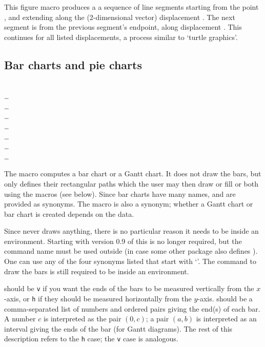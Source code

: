 \documentclass[letterpaper]{article}
\begin{document}
This figure macro produces a a sequence of line segments starting from
the point , and extending along the (2-dimen\-sional vector)
displacement . The next segment is from the previous
segment's endpoint, along displacement . This continues for
all listed displacements, a process similar to `turtle graphics'.


\subsection{Bar charts and pie charts}\label{charts}

\begin{cd}
%
  \\
\dots\\
\dots\\
\dots\\
\dots\\
\dots\\
\dots\\
\dots
{}%
%
%
%
\end{cd}

The macro  computes a bar chart or a Gantt chart. It does
not draw the bars, but only defines their rectangular paths which the
user may then draw or fill or both using the  macros (see
below). Since bar charts have many names,  and
 are provided as synonyms. The macro  is also a
synonym; whether a Gantt chart or bar chart is created depends on the
data.

Since  never draws anything, there is no particular reason
it needs to be inside an  environment. Starting with version
0.9 of \mfp{} this is no longer required, but the command name
 must be used outside (in case some other package also
defines ). One can use any of the four synonyms listed that
start with `'. The command to draw the bars is still required to
be inside an  environment.

 should be \texttt{v} if you want the ends of the bars to
be measured vertically from the $x$-axis, or \texttt{h} if they should
be measured horizontally from the $y$-axis.  should be a
comma-separated list of numbers and ordered pairs giving the
end(s) of each bar. A number $c$ is interpreted as the pair $(0,c)$; a
pair $(a,b)$ is interpreted as an interval giving the ends of the bar
(for Gantt diagrams). The rest of this description refers to the
\texttt{h} case; the \texttt{v} case is analogous.
\end{document}
